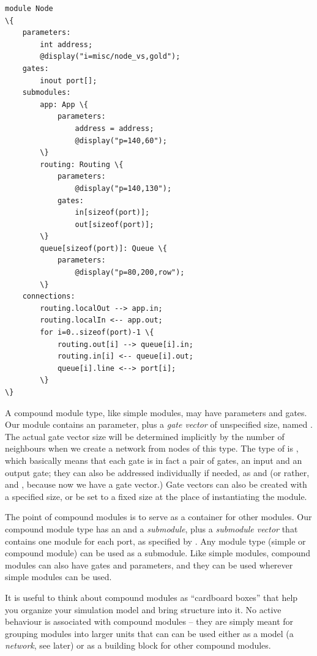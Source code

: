 \begin{Verbatim}[commandchars=\\\{\}]
module Node
\{
    parameters:
        int address;
        @display("i=misc/node_vs,gold");
    gates:
        inout port[];
    submodules:
        app: App \{
            parameters:
                address = address;
                @display("p=140,60");
        \}
        routing: Routing \{
            parameters:
                @display("p=140,130");
            gates:
                in[sizeof(port)];
                out[sizeof(port)];
        \}
        queue[sizeof(port)]: Queue \{
            parameters:
                @display("p=80,200,row");
        \}
    connections:
        routing.localOut --> app.in;
        routing.localIn <-- app.out;
        for i=0..sizeof(port)-1 \{
            routing.out[i] --> queue[i].in;
            routing.in[i] <-- queue[i].out;
            queue[i].line <--> port[i];
        \}
\}
\end{Verbatim}

A compound module type, like simple modules, may have parameters and gates.
Our  module contains an  parameter, plus a
\textit{gate vector} of unspecified size, named .
The actual gate vector size will be determined implicitly by the number
of neighbours when we create a network from nodes of this type.
The type of  is , which basically means that
each gate is in fact a pair of gates, an input and an output gate;
they can also be addressed individually if needed, as  and
 (or rather,  and ,
because now we have a gate vector.) Gate vectors can also be created with
a specified size, or be set to a fixed size at the place
of instantiating the module.

The point of compound modules is to serve as a container for other
modules. Our  compound module type has an  and
a  \textit{submodule}, plus a  \textit{submodule vector}
that contains one  module for each port, as specified by
.
Any module type (simple or compound module) can be used as a submodule.
Like simple modules, compound modules can also have gates and parameters,
and they can be used wherever simple modules can be used.

It is useful to think about compound modules as ``cardboard boxes''
that help you organize your simulation model and bring structure into
it. No active behaviour is associated with compound modules -- they
are simply meant for grouping modules into larger units that can
can be used either as a model (a \textit{network}, see later)
or as a building block for other compound modules.

